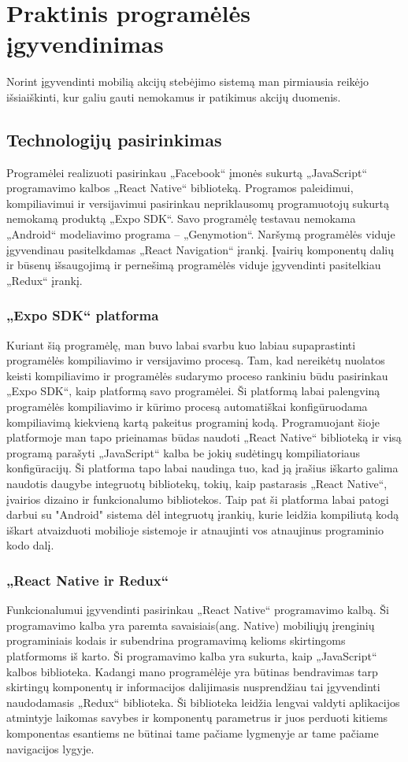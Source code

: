 \documentclass[a4paper,12pt,fleqn]{article}
\begin{document}
\newpage
\section{Praktinis programėlės įgyvendinimas}
Norint įgyvendinti mobilią akcijų stebėjimo sistemą man pirmiausia reikėjo išsiaiškinti, kur galiu gauti nemokamus ir patikimus akcijų duomenis.
\subsection{Technologijų pasirinkimas}
Programėlei realizuoti pasirinkau „Facebook“ įmonės sukurtą „JavaScript“ programavimo kalbos „React Native“ biblioteką. Programos paleidimui, kompiliavimui ir versijavimui pasirinkau nepriklausomų programuotojų sukurtą nemokamą produktą „Expo SDK“. Savo programėlę testavau nemokama „Android“ modeliavimo programa – „Genymotion“. Naršymą programėlės viduje įgyvendinau pasitelkdamas „React Navigation“ įrankį. Įvairių komponentų dalių ir būsenų išsaugojimą ir pernešimą programėlės viduje įgyvendinti pasitelkiau „Redux“ įrankį.
\subsubsection{„Expo SDK“ platforma}
Kuriant šią programėlę, man buvo labai svarbu kuo labiau supaprastinti programėlės kompiliavimo ir versijavimo procesą. Tam, kad nereikėtų nuolatos keisti kompiliavimo ir programėlės sudarymo proceso rankiniu būdu pasirinkau „Expo SDK“, kaip platformą savo programėlei. Ši platformą labai palengviną programėlės kompiliavimo ir kūrimo procesą automatiškai konfigūruodama kompiliavimą kiekvieną kartą pakeitus programinį kodą. Programuojant šioje platformoje man tapo prieinamas būdas naudoti „React Native“ biblioteką ir visą programą parašyti „JavaScript“ kalba be jokių sudėtingų kompiliatoriaus konfigūracijų. Ši platforma tapo labai naudinga tuo, kad ją įrašius iškarto galima naudotis daugybe integruotų bibliotekų, tokių, kaip pastarasis „React Native“, įvairios dizaino ir funkcionalumo bibliotekos. Taip pat ši platforma labai patogi darbui su "Android" sistema dėl integruotų įrankių, kurie leidžia kompiliutą kodą iškart atvaizduoti mobilioje sistemoje ir atnaujinti vos atnaujinus programinio kodo dalį.
\subsubsection{„React Native ir Redux“}
Funkcionalumui įgyvendinti pasirinkau „React Native“ programavimo kalbą. Ši programavimo kalba yra paremta savaisiais(ang. Native) mobiliųjų įrenginių programiniais kodais ir subendrina programavimą kelioms skirtingoms platformoms iš karto. Ši programavimo kalba yra sukurta, kaip „JavaScript“ kalbos biblioteka. Kadangi mano programėlėje yra būtinas bendravimas tarp skirtingų komponentų ir informacijos dalijimasis nusprendžiau tai įgyvendinti naudodamasis „Redux“ biblioteka. Ši biblioteka leidžia lengvai valdyti aplikacijos atmintyje laikomas savybes ir komponentų parametrus ir juos perduoti kitiems komponentas esantiems ne būtinai tame pačiame lygmenyje ar tame pačiame navigacijos lygyje.
\end{document}
